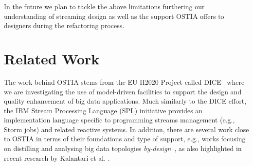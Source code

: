 \documentclass[smallextended]{svjour3}       %
\newcommand{\todoMB}[2]{\linespread{0.7}\todo[color=yellow!50,#1]{\scriptsize\textbf{MB:}#2}}
\begin{document}

In the future we plan to tackle the above limitations furthering our understanding of streaming design as well as the support OSTIA offers to designers during the refactoring process.



\section{Related Work}
\label{rw}
%


The work behind OSTIA stems from the EU H2020 Project called DICE~\cite{dice2020}
where we are investigating the use of model-driven facilities to support the design and quality enhancement of big data applications. Much similarly to the DICE effort, the IBM Stream Processing Language (SPL) initiative \cite{ibmspl} provides an implementation language specific to programming streams management (e.g., Storm jobs) and related reactive systems. In addition, there are several work close to OSTIA in terms of their foundations and type of support, e.g., works focusing on distilling and analysing big data topologies \emph{by-design}~\cite{SNASEL2017286}, as also highlighted in recent research by Kalantari et al. \cite{Kalantari2017}. 
\end{document}
